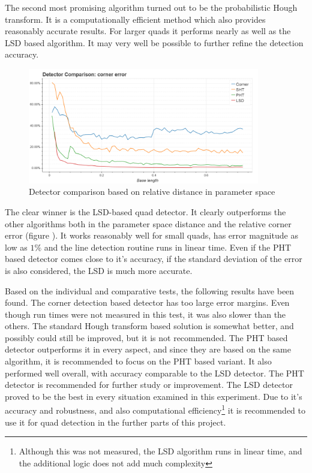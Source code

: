 The second most promising algorithm turned out to be the probabilistic Hough transform.
It is a computationally efficient method which also provides reasonably accurate results.
For larger quads it performs nearly as well as the LSD based algorithm.
It may very well be possible to further refine the detection accuracy.

\begin{figure}[ht]
	\centering
	\includegraphics[width=0.9\textwidth]{figures/plots/detector_comp_corner_error.png}
	\caption{Detector comparison based on relative distance in parameter space}
	\label{fig:detCmpCorner}
\end{figure}
The clear winner is the LSD-based quad detector.
It clearly outperforms the other algorithms both in the parameter space distance and the relative corner error (figure ).
It works reasonably well for small quads, has error magnitude as low as $1\%$ and the line detection routine runs in linear time.
Even if the PHT based detector comes close to it's accuracy, if the standard deviation of the error is also considered, the LSD is much more accurate.

Based on the individual and comparative tests, the following results have been found.
The corner detection based detector has too large error margins.
Even though run times were not measured in this test, it was also slower than the others.
The standard Hough transform based solution is somewhat better, and possibly could still be improved, but it is not recommended.
The PHT based detector outperforms it in every aspect, and since they are based on the same algorithm, it is recommended to focus on the PHT based variant.
It also performed well overall, with accuracy comparable to the LSD detector.
The PHT detector is recommended for further study or improvement.
The LSD detector proved to be the best in every situation examined in this experiment.
Due to it's accuracy and robustness, and also computational efficiency\footnote{Although this was not measured, the LSD algorithm runs in linear time, and the additional logic does not add much complexity} it is recommended to use it for quad detection in the further parts of this project.
